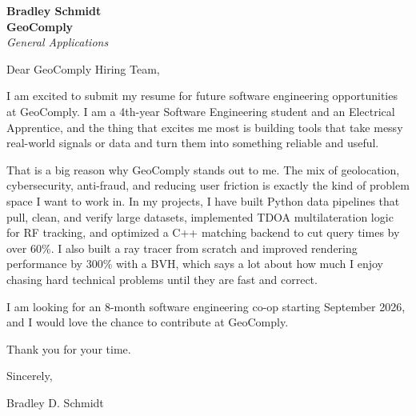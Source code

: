 \documentclass[11pt]{article}
\begin{document}
\textbf{Bradley Schmidt}\\
\vspace{0.5em}
\textbf{GeoComply}\\
\textit{General Applications}

Dear GeoComply Hiring Team,

\par

I am excited to submit my resume for future software engineering opportunities at GeoComply. I am a 4th-year Software Engineering student and an Electrical Apprentice, and the thing that excites me most is building tools that take messy real-world signals or data and turn them into something reliable and useful.

\par

That is a big reason why GeoComply stands out to me. The mix of geolocation, cybersecurity, anti-fraud, and reducing user friction is exactly the kind of problem space I want to work in. In my projects, I have built Python data pipelines that pull, clean, and verify large datasets, implemented TDOA multilateration logic for RF tracking, and optimized a C++ matching backend to cut query times by over 60\%. I also built a ray tracer from scratch and improved rendering performance by 300\% with a BVH, which says a lot about how much I enjoy chasing hard technical problems until they are fast and correct.

\par

I am looking for an 8-month software engineering co-op starting September 2026, and I would love the chance to contribute at GeoComply.

\par

Thank you for your time.

\par

Sincerely,

\par

Bradley D. Schmidt
\end{document}

